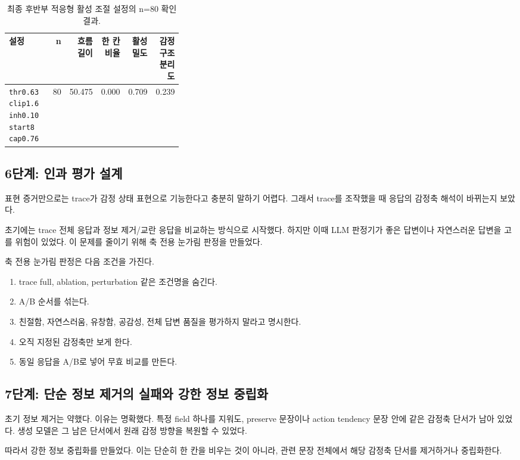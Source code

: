 \documentclass[11pt,a4paper]{article}
\begin{document}
\begin{table}[h]
\centering
\small
\begin{tabular}{p{0.34\linewidth}rrrrr}
\toprule
설정 & n & 흐름 길이 & 한 칸 비율 & 활성 밀도 & 감정 구조 분리도 \\
\midrule
\texttt{thr0.63 clip1.6 inh0.10 start8 cap0.76} & 80 & 50.475 & 0.000 & 0.709 & 0.239 \\
\bottomrule
\end{tabular}
\caption{최종 후반부 적응형 활성 조절 설정의 n=80 확인 결과.}
\label{tab:adaptive-confirm}
\end{table}

\subsection{6단계: 인과 평가 설계}

표현 증거만으로는 trace가 감정 상태 표현으로 기능한다고 충분히 말하기 어렵다. 그래서 trace를 조작했을 때 응답의 감정축 해석이 바뀌는지 보았다.

초기에는 trace 전체 응답과 정보 제거/교란 응답을 비교하는 방식으로 시작했다. 하지만 이때 LLM 판정기가 좋은 답변이나 자연스러운 답변을 고를 위험이 있었다. 이 문제를 줄이기 위해 축 전용 눈가림 판정을 만들었다.

축 전용 눈가림 판정은 다음 조건을 가진다.

\begin{enumerate}
  \item trace full, ablation, perturbation 같은 조건명을 숨긴다.
  \item A/B 순서를 섞는다.
  \item 친절함, 자연스러움, 유창함, 공감성, 전체 답변 품질을 평가하지 말라고 명시한다.
  \item 오직 지정된 감정축만 보게 한다.
  \item 동일 응답을 A/B로 넣어 무효 비교를 만든다.
\end{enumerate}

\subsection{7단계: 단순 정보 제거의 실패와 강한 정보 중립화}

초기 정보 제거는 약했다. 이유는 명확했다. 특정 field 하나를 지워도, preserve 문장이나 action tendency 문장 안에 같은 감정축 단서가 남아 있었다. 생성 모델은 그 남은 단서에서 원래 감정 방향을 복원할 수 있었다.

따라서 강한 정보 중립화를 만들었다. 이는 단순히 한 칸을 비우는 것이 아니라, 관련 문장 전체에서 해당 감정축 단서를 제거하거나 중립화한다.
\end{document}
